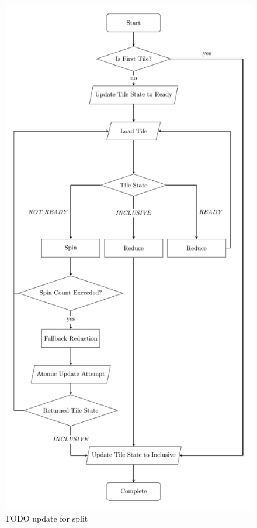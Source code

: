 \documentclass[sigconf]{acmart}
\begin{document}
\begin{figure}[h]
  \centering
  \includegraphics[width=\linewidth]{graphics/FlowChart.pdf}
  \caption{TODO update for split}
\end{figure}
\end{document}

